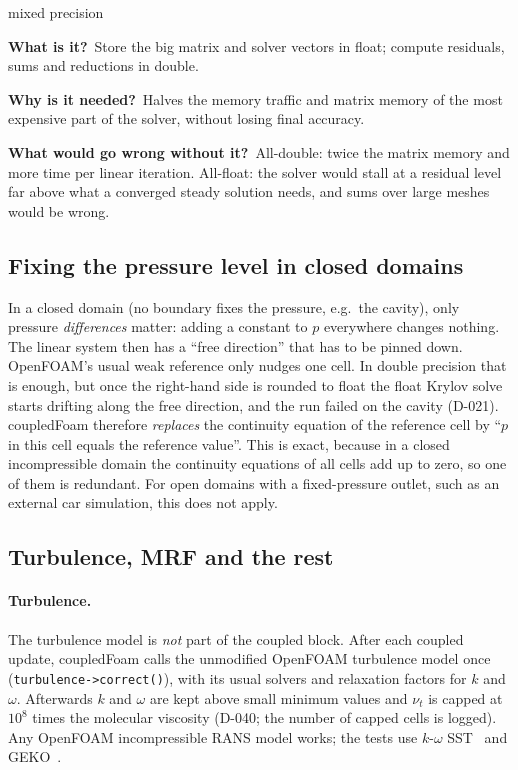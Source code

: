 \documentclass[11pt,a4paper]{article}
\newcommand{\code}[1]{\texttt{#1}}
\newcommand{\bbwhat}{\par\smallskip\noindent\textbf{What is it?}\ }
\newcommand{\bbwhy}{\par\smallskip\noindent\textbf{Why is it needed?}\ }
\newcommand{\bbwithout}{\par\smallskip\noindent\textbf{What would go wrong
  without it?}\ }
\begin{document}
\begin{bblock}{mixed precision}
\bbwhat Store the big matrix and solver vectors in float; compute residuals,
sums and reductions in double.
\bbwhy Halves the memory traffic and matrix memory of the most expensive
part of the solver, without losing final accuracy.
\bbwithout All-double: twice the matrix memory and more time per linear
iteration. All-float: the solver would stall at a residual level far above
what a converged steady solution needs, and sums over large meshes would be
wrong.
\end{bblock}

\subsection{Fixing the pressure level in closed domains}\label{sec:pref}

In a closed domain (no boundary fixes the pressure, e.g.\ the cavity), only
pressure \emph{differences} matter: adding a constant to $p$ everywhere
changes nothing. The linear system then has a ``free direction'' that has
to be pinned down. OpenFOAM's usual weak reference only nudges one cell. In
double precision that is enough, but once the right-hand side is rounded to
float the float Krylov solve starts drifting along the free direction, and
the run failed on the cavity (D-021). coupledFoam therefore \emph{replaces}
the continuity equation of the reference cell by ``$p$ in this cell equals
the reference value''. This is exact, because in a closed incompressible
domain the continuity equations of all cells add up to zero, so one of them
is redundant. For open domains with a fixed-pressure outlet, such as an
external car simulation, this does not apply.

\subsection{Turbulence, MRF and the rest}\label{sec:turb}

\paragraph{Turbulence.} The turbulence model is \emph{not} part of the
coupled block. After each coupled update, coupledFoam calls the unmodified
OpenFOAM turbulence model once (\code{turbulence->correct()}), with its
usual solvers and relaxation factors for $k$ and $\omega$. Afterwards $k$
and $\omega$ are kept above small minimum values and $\nu_t$ is capped at
$10^8$ times the molecular viscosity (D-040; the number of capped cells is
logged). Any OpenFOAM incompressible RANS model works; the tests use
$k$-$\omega$ SST~\cite{Menter1994} and GEKO~\cite{Menter2025GEKO}.
\end{document}
